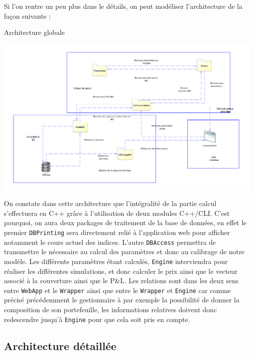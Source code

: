 \documentclass[french,12pt,a4paper]{article}
\begin{document}
Si l'on rentre un peu plus dans le détails, on peut modéliser l'architecture de la façon suivante :


\begin{center}
\caption{Architecture globale}
\end{center}

\begin{center}
\includegraphics[scale=0.6]{../MAXI_ARCHI.png}
\end{center}

On constate dans cette architecture que l'intégralité de la partie calcul s'effectuera en C++ grâce à l'utilisation de deux modules C++/CLI. C'est pourquoi, on aura deux packages de traitement de la base de données, en effet le premier \lstinline!DBPrinting! sera directement relié à l'application web pour afficher notamment le cours actuel des indices. L'autre \lstinline!DBAccess! permettra de transmettre le nécessaire au calcul des paramètres et donc au calibrage de notre modèle. Les différents paramètres étant calculés, \lstinline!Engine! interviendra pour réaliser les différentes simulations, et donc calculer le prix ainsi que le vecteur associé à la couverture ainsi que le P\&L. Les relations sont dans les deux sens entre \lstinline!WebApp! et le \lstinline!Wrapper! ainsi que entre le \lstinline!Wrapper! et \lstinline!Engine! car comme précisé précédemment le gestionnaire à par exemple la possibilité de donner la composition de son portefeuille, les informations relatives doivent donc redescendre jusqu'à \lstinline!Engine! pour que cela soit pris en compte.

\subsection{Architecture détaillée}
\end{document}
